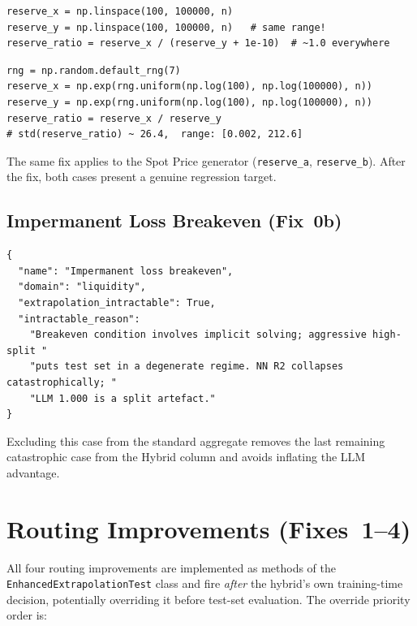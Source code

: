 \documentclass[11pt,a4paper]{article}
\begin{document}
\begin{lstlisting}[caption={Buggy generator — identical linspace ranges.}]
reserve_x = np.linspace(100, 100000, n)
reserve_y = np.linspace(100, 100000, n)   # same range!
reserve_ratio = reserve_x / (reserve_y + 1e-10)  # ~1.0 everywhere
\end{lstlisting}

\begin{lstlisting}[caption={Fixed generator — independent log-uniform sampling (seed=7).}]
rng = np.random.default_rng(7)
reserve_x = np.exp(rng.uniform(np.log(100), np.log(100000), n))
reserve_y = np.exp(rng.uniform(np.log(100), np.log(100000), n))
reserve_ratio = reserve_x / reserve_y
# std(reserve_ratio) ~ 26.4,  range: [0.002, 212.6]
\end{lstlisting}

The same fix applies to the Spot Price generator
(\texttt{reserve\_a}, \texttt{reserve\_b}).  After the fix, both cases present
a genuine regression target.

\subsection{Impermanent Loss Breakeven (Fix~0b)}

\begin{lstlisting}[caption={Intractable flag added to IL Breakeven catalogue entry.}]
{
  "name": "Impermanent loss breakeven",
  "domain": "liquidity",
  "extrapolation_intractable": True,
  "intractable_reason":
    "Breakeven condition involves implicit solving; aggressive high-split "
    "puts test set in a degenerate regime. NN R2 collapses catastrophically; "
    "LLM 1.000 is a split artefact."
}
\end{lstlisting}

Excluding this case from the standard aggregate removes the last remaining
catastrophic case from the Hybrid column and avoids inflating the LLM
advantage.

\section{Routing Improvements (Fixes~1--4)}
\label{sec:routing_fixes}

All four routing improvements are implemented as methods of the
\texttt{EnhancedExtrapolationTest} class and fire \emph{after} the hybrid's
own training-time decision, potentially overriding it before test-set
evaluation.  The override priority order is:
\end{document}
